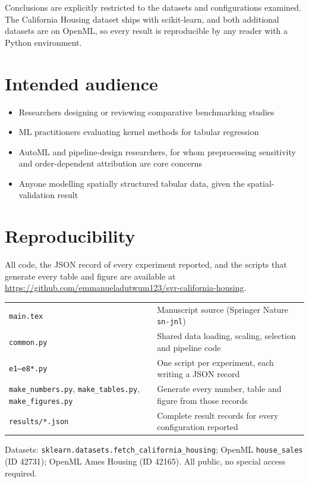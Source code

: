 \documentclass[11pt,a4paper]{article}
\begin{document}
Conclusions are explicitly restricted to the datasets and configurations examined. The
California Housing dataset ships with scikit-learn, and both additional datasets are on
OpenML, so every result is reproducible by any reader with a Python environment.

\section{Intended audience}
\begin{itemize}[leftmargin=*,itemsep=1pt]
\item Researchers designing or reviewing comparative benchmarking studies
\item ML practitioners evaluating kernel methods for tabular regression
\item AutoML and pipeline-design researchers, for whom preprocessing sensitivity and
      order-dependent attribution are core concerns
\item Anyone modelling spatially structured tabular data, given the spatial-validation result
\end{itemize}

\section{Reproducibility}
All code, the JSON record of every experiment reported, and the scripts that generate every
table and figure are available at
\url{https://github.com/emmanueladutwum123/svr-california-housing}.

\begin{center}
\begin{tabular}{@{}ll@{}}
\toprule
\texttt{main.tex} & Manuscript source (Springer Nature \texttt{sn-jnl}) \\
\texttt{common.py} & Shared data loading, scaling, selection and pipeline code \\
\texttt{e1--e8*.py} & One script per experiment, each writing a JSON record \\
\texttt{make\_numbers.py}, \texttt{make\_tables.py}, \texttt{make\_figures.py}
                    & Generate every number, table and figure from those records \\
\texttt{results/*.json} & Complete result records for every configuration reported \\
\bottomrule
\end{tabular}
\end{center}

\noindent Datasets: \texttt{sklearn.datasets.fetch\_california\_housing}; OpenML
\texttt{house\_sales} (ID 42731); OpenML Ames Housing (ID 42165). All public, no special
access required.
\end{document}
